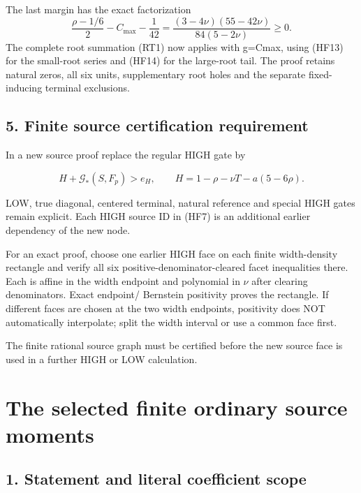 The last margin has the exact factorization \[
 \frac{\rho-1/6}{2}-C_{\max}-\frac1{42}
 =\frac{(3-4\nu)(55-42\nu)}{84(5-2\nu)}\ge0.
\] The complete root summation (RT1) now applies with g=Cmax, using (HF13) for the small-root series and (HF14) for the large-root tail. The proof retains natural zeros, all six units, supplementary root holes and the separate fixed-inducing terminal exclusions.

\hypertarget{feedback:finite-source-certification-requirement}{%
\subsection{5. Finite source certification requirement}\label{feedback:finite-source-certification-requirement}}

In a new source proof replace the regular HIGH gate by

\[
 H+\mathcal G_*(S,F_p)>e_H,\qquad
 H=1-\rho-\nu T-a(5-6\rho).
\tag{HF15}
\]

LOW, true diagonal, centered terminal, natural reference and special HIGH gates remain explicit. Each HIGH source ID in (HF7) is an additional earlier dependency of the new node.

For an exact proof, choose one earlier HIGH face on each finite width-density rectangle and verify all six positive-denominator-cleared facet inequalities there. Each is affine in the width endpoint and polynomial in \(\nu\) after clearing denominators. Exact endpoint/ Bernstein positivity proves the rectangle. If different faces are chosen at the two width endpoints, positivity does NOT automatically interpolate; split the width interval or use a common face first.

The finite rational source graph must be certified before the new source face is used in a further HIGH or LOW calculation.

\hypertarget{feedback:the-selected-finite-ordinary-source-moments}{%
\section{The selected finite ordinary source moments}\label{feedback:the-selected-finite-ordinary-source-moments}}

\hypertarget{feedback:statement-and-literal-coefficient-scope}{%
\subsection{1. Statement and literal coefficient scope}\label{feedback:statement-and-literal-coefficient-scope}}

